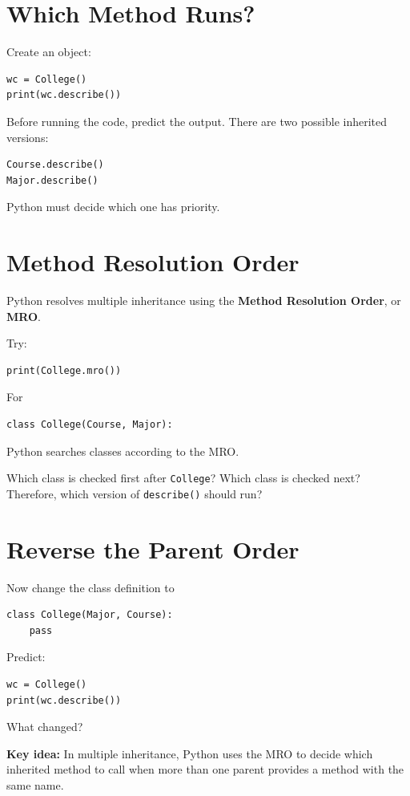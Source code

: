 \documentclass[11pt]{article}
\begin{document}
\vspace{0.25cm}

\section{Which Method Runs?}

Create an object:

\begin{verbatim}
wc = College()
print(wc.describe())
\end{verbatim}

Before running the code, predict the output.  There are two possible inherited versions:

\begin{verbatim}
Course.describe()
Major.describe()
\end{verbatim}

Python must decide which one has priority.

\section{Method Resolution Order}

Python resolves multiple inheritance using the
\textbf{Method Resolution Order}, or \textbf{MRO}.

Try:

\begin{verbatim}
print(College.mro())
\end{verbatim}

For

\begin{verbatim}
class College(Course, Major):
\end{verbatim}

Python searches classes according to the MRO.

Which class is checked first after \texttt{College}?  Which class is checked next? Therefore, which version of \texttt{describe()} should run?

\section{Reverse the Parent Order}

Now change the class definition to

\begin{verbatim}
class College(Major, Course):
    pass
\end{verbatim}

Predict:

\begin{verbatim}
wc = College()
print(wc.describe())
\end{verbatim}

What changed?

\vspace{0.3cm}

\textbf{Key idea:} In multiple inheritance, Python uses the MRO to
decide which inherited method to call when more than one parent
provides a method with the same name.
\end{document}
